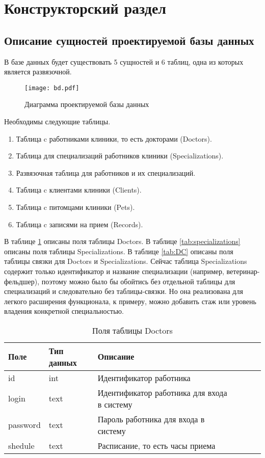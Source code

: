 \section{Конструкторский раздел}

\subsection{Описание сущностей проектируемой базы данных}

В базе данных будет существовать 5 сущностей и 6 таблиц, одна из которых является развязочной. 
\begin{figure}[hbtp]
	\centering
	\texttt{[image: bd.pdf]}
	\caption{Диаграмма проектируемой базы данных}
	\label{img:idef}
\end{figure}

Необходимы следующие таблицы.
\begin{enumerate}[label=\arabic*)]
	\item Таблица c работниками клиники, то есть докторами (Doctors).
	\item Таблица для специализаций работников клиники (Specializations).
	\item Развязочная таблица для работников и их специализаций.
	\item Таблица c клиентами клиники (Clients).
	\item Таблица c питомцами клиники (Pets).
	\item Таблица c записями на прием (Records).
\end{enumerate}

В таблице \ref{tab:doctors}  описаны поля таблицы Doctors. В таблице \ref{tab:specializations} описаны поля таблицы Specializations. В таблице \ref{tab:DC} описаны поля таблицы связки для Doctors и Specializations. Сейчас таблица Specializations содержит только идентификатор и название специализации (например, ветеринар-фельдшер), поэтому можно было бы обойтись без отдельной таблицы для специализаций и следовательно без таблицы-связки. Но она реализована для легкого расширения функционала, к примеру, можно добавить стаж или уровень владения конкретной специальностью.

\begin{table}[hbtp]
	\begin{center}
			\captionsetup{justification=raggedright, singlelinecheck=false}
			\caption{\label{tab:doctors}Поля таблицы Doctors}
		\begin{tabular}{|l|l|l|l|l|l|}
			\hline {Поле} & {Тип данных} & {Описание}  \\ \hline
			id  & int & Идентификатор работника   \\ \hline
			login & text & Идентификатор работника для входа в систему \\ \hline
			password & text & Пароль работника для входа в систему  \\ \hline
			shedule & text & Расписание, то есть часы приема\\ \hline
		\end{tabular}
	\end{center}
\end{table}


